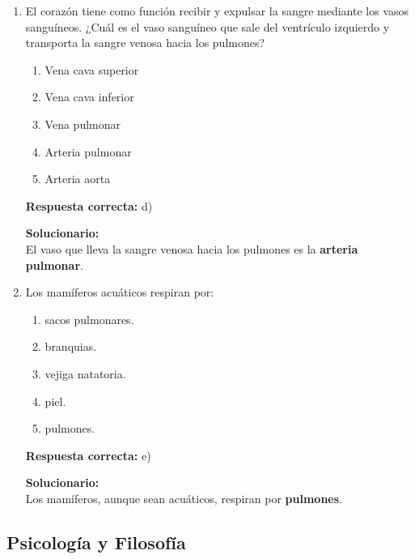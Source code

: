 \begin{enumerate}
	
	\item El corazón tiene como función recibir y expulsar la sangre mediante los vasos sanguíneos. ¿Cuál es el vaso sanguíneo que sale del ventrículo izquierdo y transporta la sangre venosa hacia los pulmones?
	\begin{enumerate}[label=\alph*)]
		\item Vena cava superior
		\item Vena cava inferior
		\item Vena pulmonar
		\item Arteria pulmonar
		\item Arteria aorta
	\end{enumerate}
	\textbf{Respuesta correcta:} d)
	
	\vspace{2mm}
	\textbf{Solucionario:}\\
	El vaso que lleva la sangre venosa hacia los pulmones es la \textbf{arteria pulmonar}.
	
	\vspace{6mm}
	
	\item Los mamíferos acuáticos respiran por:
	\begin{enumerate}[label=\alph*)]
		\item sacos pulmonares.
		\item branquias.
		\item vejiga natatoria.
		\item piel.
		\item pulmones.
	\end{enumerate}
	\textbf{Respuesta correcta:} e)
	
	\vspace{2mm}
	\textbf{Solucionario:}\\
	Los mamíferos, aunque sean acuáticos, respiran por \textbf{pulmones}.
	
	\vspace{6mm}
	
\end{enumerate}

\subsection*{Psicología y Filosofía}

